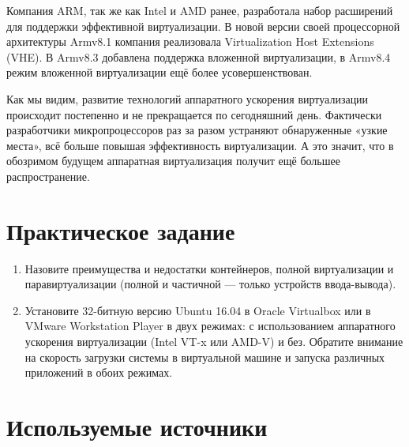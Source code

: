 \documentclass[14pt, a4paper]{article}
\begin{document}
Компания ARM, так же как Intel и AMD ранее, разработала набор расширений для поддержки
эффективной виртуализации. В новой версии своей процессорной архитектуры Armv8.1 компания
реализовала Virtualization Host Extensions (VHE). В Armv8.3 добавлена поддержка вложенной
виртуализации, в Armv8.4 режим вложенной виртуализации ещё более усовершенствован.

Как мы видим, развитие технологий аппаратного ускорения виртуализации происходит постепенно и
не прекращается по сегодняшний день. Фактически разработчики микропроцессоров раз за разом
устраняют обнаруженные «узкие места», всё больше повышая эффективность виртуализации. А это
значит, что в обозримом будущем аппаратная виртуализация получит ещё большее распространение.\newpage

\section*{Практическое задание}

\begin{enumerate}
    \item Назовите преимущества и недостатки контейнеров, полной виртуализации и
    паравиртуализации (полной и частичной — только устройств ввода-вывода).
    \item Установите 32-битную версию Ubuntu 16.04 в Oracle Virtualbox или в VMware Workstation Player
    в двух режимах: с использованием аппаратного ускорения виртуализации (Intel VT-x или
    AMD-V) и без. Обратите внимание на скорость загрузки системы в виртуальной машине и
    запуска различных приложений в обоих режимах.
\end{enumerate}

\section*{Используемые источники}
\end{document}
